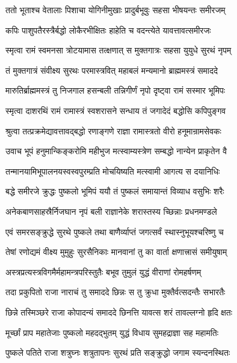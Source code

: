 \twolineshloka
{ततो भूताश्च वेतालाः पिशाचा योगिनीमुखाः}
{प्रादुर्बभूवुः सहसा भीषयन्तः समीरजम्}%

\twolineshloka
{कपिः पाशुपतैरस्त्रैर्बद्धो लोकैरभीक्षितः}
{हाहेति च वदन्त्येते यावत्तावत्समीरजः}%

\twolineshloka
{स्मृत्वा रामं स्वमनसा त्रोटयामास तत्क्षणात्}
{स मुक्तगात्रः सहसा युयुधे सुरथं नृपम्}%

\twolineshloka
{तं मुक्तगात्रं संवीक्ष्य सुरथः परमास्त्रवित्}
{महाबलं मन्यमानो ब्राह्ममस्त्रं समाददे}%

\twolineshloka
{मारुतिर्ब्राह्ममस्त्रं तु निजगाल हसन्बली}
{तन्निगीर्णं नृपो दृष्ट्वा रामं सस्मार भूमिपः}%

\twolineshloka
{स्मृत्वा दाशरथिं रामं रामास्त्रं स्वशरासने}
{सन्धाय तं जगादेदं बद्धोसि कपिपुङ्गव}%

\twolineshloka
{श्रुत्वा तत्प्रक्रमेद्यावत्तावद्बद्धो रणाङ्गणे}
{राज्ञा रामास्त्रतो वीरो हनूमान्रामसेवकः}%

\twolineshloka
{उवाच भूपं हनुमान्किङ्करोमि महीभुज}
{मत्स्वाम्यस्त्रेण सम्बद्धो नान्येन प्राकृतेन वै}%

\twolineshloka
{तन्मानयामिभूपालनयस्वस्वपुरम्प्रति}
{मोचयिष्यति मत्स्वामी आगत्य स दयानिधिः}%

\twolineshloka
{बद्धे समीरजे क्रुद्धः पुष्कलो भूमिपं ययौ}
{तं पुष्कलं समायान्तं विव्याध वसुभिः शरैः}%

\twolineshloka
{अनेकबाणसाहस्रैर्निजघान नृपं बली}
{राज्ञानेके शरास्तस्य च्छिन्नाः प्रधनमण्डले}%

\twolineshloka
{एवं समरसङ्क्रुद्धे सुरथे पुष्कले तथा}
{बाणैर्व्याप्तं जगत्सर्वं स्थास्नुभूयश्चरिष्णु च}%

\twolineshloka
{तेषां रणोद्यमं वीक्ष्य मुमुहुः सुरसैनिकाः}
{मानवानां तु का वार्ता क्षणात्त्रासं समीयुषाम्}%

\twolineshloka
{अस्त्रप्रत्यस्त्रविगमैर्महामन्त्रपरिस्तुतैः}
{बभूव तुमुलं युद्धं वीराणां रोमहर्षणम्}%

\twolineshloka
{तदा प्रकुपितो राजा नाराचं तु समाददे}
{छिन्नः स तु क्रुधा मुक्तैर्वत्सदन्तैः सभारतैः}%

\twolineshloka
{छिन्ने तस्मिञ्छरे राजा कोपादन्यं समाददे}
{छिनत्ति यावत्स शरं तावल्लग्नो हृदि क्षतः}%

\twolineshloka
{मूर्च्छां प्राप महातेजाः पुष्कलो महदद्भुतम्}
{युद्धं विधाय सुमहद्राज्ञा सह महामतिः}%

\twolineshloka
{पुष्कले पतिते राजा शत्रुघ्नः शत्रुतापनः}
{सुरथं प्रति सङ्क्रुद्धो जगाम स्यन्दनस्थितः}%

